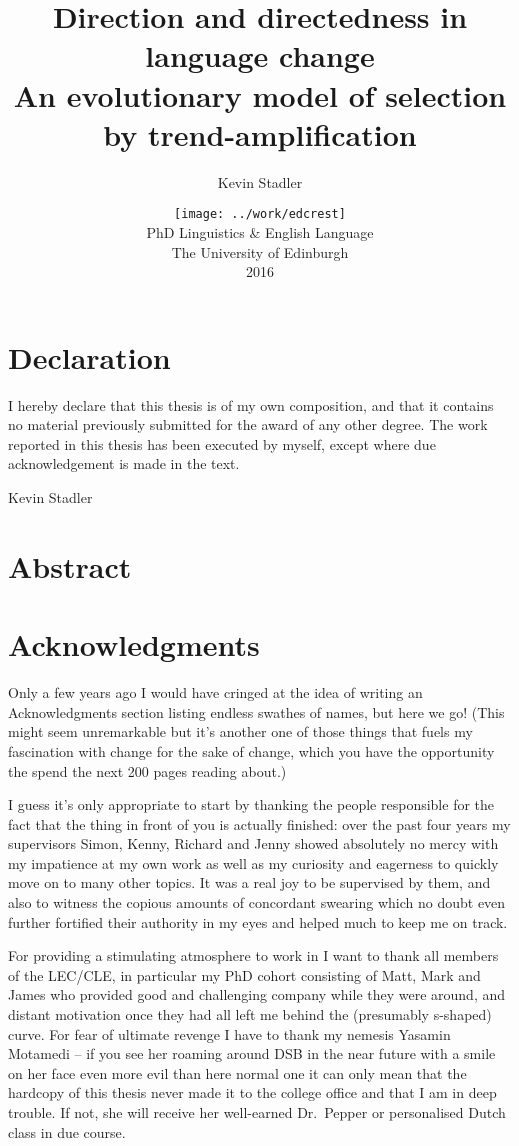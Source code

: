 \documentclass[oneside]{book}
\author{Kevin Stadler}
\title{Direction and directedness in language change\\\large An evolutionary model of selection by trend-amplification}
\date{\vfill\texttt{[image: ../work/edcrest]}\\
\vspace{1em}
PhD Linguistics \& English Language\\
The University of Edinburgh\\
2016}
\begin{document}
\maketitle

\frontmatter

\chapter*{Declaration}
I hereby declare that this thesis is of my own composition, and that it contains no material previously submitted for the award of any other degree. The work reported in this thesis has been executed by myself, except where due
acknowledgement is made in the text.

\vspace{1in}\hfill Kevin Stadler

\chapter*{Abstract}


\chapter*{Acknowledgments}

Only a few years ago I would have cringed at the idea of writing an Acknowledgments section listing endless swathes of names, but here we go! (This might seem unremarkable but it's another one of those things that fuels my fascination with change for the sake of change, which you have the opportunity the spend the next 200 pages reading about.)

I guess it's only appropriate to start by thanking the people responsible for the fact that the thing in front of you is actually finished: over the past four years my supervisors Simon, Kenny, Richard and Jenny showed absolutely no mercy with my impatience at my own work as well as my curiosity and eagerness to quickly move on to many other topics. It was a real joy to be supervised by them, and also to witness the copious amounts of concordant swearing which no doubt even further fortified their authority in my eyes and helped much to keep me on track.

For providing a stimulating atmosphere to work in I want to thank all members of the LEC/CLE, in particular my PhD cohort consisting of Matt, Mark and James who provided good and challenging company while they were around, and distant motivation once they had all left me behind the (presumably s-shaped) curve.
For fear of ultimate revenge I have to thank my nemesis Yasamin Motamedi -- if you see her roaming around DSB in the near future with a smile on her face even more evil than here normal one it can only mean that the hardcopy of this thesis never made it to the college office and that I am in deep trouble. If not, she will receive her well-earned Dr.~Pepper or personalised Dutch class in due course.
\end{document}
